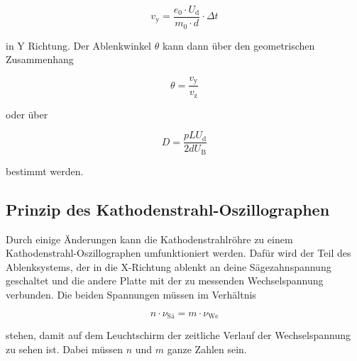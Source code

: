 \begin{equation}
    v_\text{y} = \frac{e_0 \cdot U_\text{d}}{m_0 \cdot d} \cdot \Delta t
    \label{eq:yges}
\end{equation}

in Y Richtung.
Der Ablenkwinkel $\theta$ kann dann über den geometrischen Zusammenhang

\begin{equation}
    \theta = \frac{v_\text{y}}{v_\text{z}}
    \label{eq:theta1}
\end{equation}

oder über 

\begin{equation}
    D = \frac{p L U_\text{d}}{2 d U_\text{B}}
    \label{eq:verschiebung}
\end{equation}

bestimmt werden.

\subsection{Prinzip des Kathodenstrahl-Oszillographen}
\label{ssec:t3}

Durch einige Änderungen kann die Kathodenstrahlröhre zu einem Kathodenstrahl-Oszillographen umfunktioniert werden.
Dafür wird der Teil des Ablenksystems, der in die X-Richtung ablenkt an deine Sägezahnspannung geschaltet und die andere Platte mit der zu messenden Wechselspannung verbunden.
Die beiden Spannungen müssen im Verhältnis 

\begin{equation}
n \cdot \nu _\text{Sä} = m \cdot \nu _\text{We}
    \label{eq:verh}
\end{equation}

stehen, damit auf dem Leuchtschirm der zeitliche Verlauf der Wechselspannung zu sehen ist.
Dabei müssen $n$ und $m$ ganze Zahlen sein.